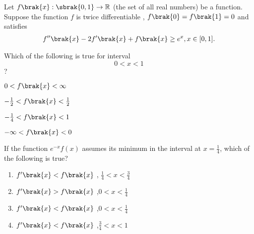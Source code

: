 \item 
{
Let $f\brak{x} : \sbrak{0,1} \to\mathbb{R}$
(the set of all real numbers) be a function. Suppose the function $f$ is twice differentiable , $f\brak{0}=f\brak{1}=0$ and satisfies \begin{align} f''\brak{x}-2f'\brak{x}+f\brak{x} \geq e^x , x \in [0,1].\end{align} 

\item Which of the following is true for interval     $$0<x<1$$?
\hfill{}

\begin{enumerate}
\begin{multicols}{2}
\item $0<f\brak{x}< \infty$ 
\columnbreak
\item $ -\frac{1}{2} <f\brak{x}< \frac{1}{2}$
\end{multicols}
\begin{multicols}{2}
\item $-\frac{1}{4}<f\brak{x}<1$
\item $-\infty <f\brak{x}<0$
\end{multicols}
\end{enumerate}


	\item If the function $e^{-x}f(x)$ assumes its minimum in the interval  at $x=\frac{1}{4}$, which of the following is true?


\hfill{}

	\begin{enumerate}

		\item $f'\brak{x}<f\brak{x}$ , $\frac{1}{4}<x<\frac{3}{4}$ \\

		\item $f'\brak{x}>f\brak{x}$ ,$0<x<\frac{1}{4}$ \\ 

		\item $f'\brak{x}<f\brak{x}$ ,$0<x<\frac{1}{4}$ \\

		\item $f'\brak{x}<f\brak{x}$ ,$\frac{3}{4}<x<1$ \\


	\end{enumerate}
}
